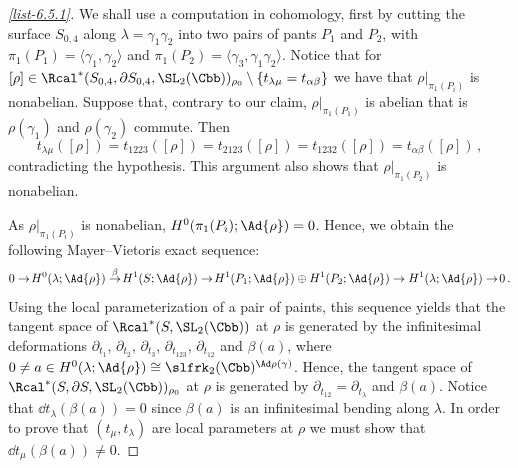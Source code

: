 \begin{proofc}

\begin{proof}[\eqref{list-6.5.1}]
We shall use a computation in cohomology, first by cutting the surface $S_{0,4}$ along $\lambda=\gamma_1\gamma_2$ into two pairs of pants $P_1$ and $P_2$, with $\pi_1(P_1)=\langle \gamma_1,\gamma_2 \rangle $ and $\pi_1(P_2)=\langle \gamma_3,\gamma_1\gamma_2 \rangle $. Notice that for $[\rho]\in \Rcal^*(S_{0,4},\partial S_{0,4}, \SL_2(\Cbb))_{\rho_0}\setminus\{t_{\lambda\mu}=t_{\alpha\beta}\}$ we have that $\rho\vert_{ \pi_1(P_i)}$ is nonabelian. Suppose that, contrary to our claim, $\rho\vert_{ \pi_1(P_1)}$ is abelian that is $\rho(\gamma_1)$ and $\rho(\gamma_2)$ commute. Then
\[
t_{\lambda\mu}([\rho]) = t_{1223}([\rho]) = t_{2123}([\rho])=t_{1232}([\rho]) = t_{\alpha\beta}([\rho])\,,
\]
contradicting the hypothesis. This argument also shows that $\rho\vert_{ \pi_1(P_2)}$ is nonabelian.

As $\rho\vert_{\pi_1(P_i)}$ is nonabelian, $H^0(\pi_1(P_i);\Ad {\rho})=0$. Hence, we obtain the following Mayer--Vietoris exact sequence:
\[
0\to\!H^0(\lambda;\Ad {\rho})\overset \beta \to\!H^1(S;\Ad {\rho})\to\!H^1(P_1 ;\Ad {\rho})\oplus H^1(P_2; \Ad {\rho})\to H^1(\lambda ;\Ad {\rho})\to\!0\,.
\]
Using the local parameterization of a pair of paints, this sequence yields that the tangent space of $\Rcal^*(S,\SL_2(\Cbb))$ at $\rho$ is generated by the infinitesimal deformations $\partial_{t_1}$, $\partial_{t_2}$, $\partial_{t_3}$, $\partial_{t_{123}}$, $\partial_{t_{12}}$ and $\beta(a)$, where $0\neq a\in H^0(\lambda;\Ad {\rho})\cong \slfrk_2 (\Cbb)^{\Ad\rho(\gamma) }$. Hence, the tangent space of $\Rcal^*(S,\partial S,\SL_2(\Cbb))_{\rho_0}$ at $\rho$ is generated by $\partial_{t_{12}}=\partial_{t_\lambda}$ and $\beta(a)$. Notice that $\dd t_{\lambda} (\beta(a))=0$ since $\beta(a)$ is an infinitesimal bending along $\lambda$. In order to prove that $(t_\mu,t_\lambda)$ are local parameters at $\rho$ we must show that $\dd t_{\mu} (\beta(a))\neq 0 $.



\end{proof}
\end{proofc}
